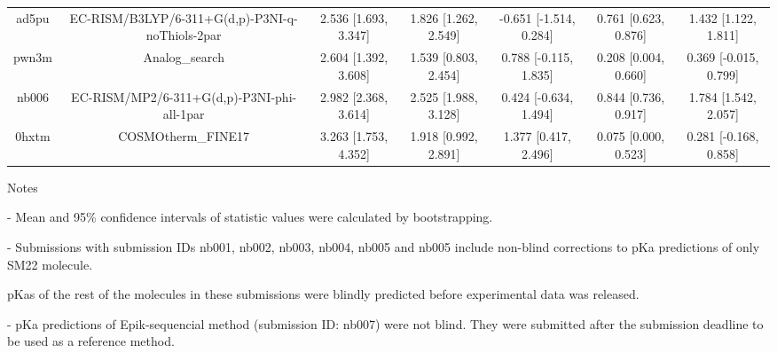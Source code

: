 \documentclass{article}
\begin{document}
\begin{center}
\begin{longtable}{|ccccccc|}
 ad5pu &    EC-RISM/B3LYP/6-311+G(d,p)-P3NI-q-noThiols-2par &  2.536 [1.693, 3.347] &  1.826 [1.262, 2.549] &   -0.651 [-1.514, 0.284] &  0.761 [0.623, 0.876] &   1.432 [1.122, 1.811] \\
 pwn3m &                                     Analog\_search &  2.604 [1.392, 3.608] &  1.539 [0.803, 2.454] &    0.788 [-0.115, 1.835] &  0.208 [0.004, 0.660] &  0.369 [-0.015, 0.799] \\
 nb006 &         EC-RISM/MP2/6-311+G(d,p)-P3NI-phi-all-1par &  2.982 [2.368, 3.614] &  2.525 [1.988, 3.128] &    0.424 [-0.634, 1.494] &  0.844 [0.736, 0.917] &   1.784 [1.542, 2.057] \\
 0hxtm &                                 COSMOtherm\_FINE17 &  3.263 [1.753, 4.352] &  1.918 [0.992, 2.891] &     1.377 [0.417, 2.496] &  0.075 [0.000, 0.523] &  0.281 [-0.168, 0.858] \\
\end{longtable}
\end{center}

Notes

- Mean and 95\% confidence intervals of statistic values were calculated by bootstrapping.

- Submissions with submission IDs nb001, nb002, nb003, nb004, nb005 and nb005 include non-blind corrections to pKa predictions of only SM22 molecule.

pKas of the rest of the molecules in these submissions were blindly predicted before experimental data was released.

- pKa predictions of Epik-sequencial method (submission ID: nb007) were not blind. They were submitted after the submission deadline to be used as a reference method.
\end{document}
